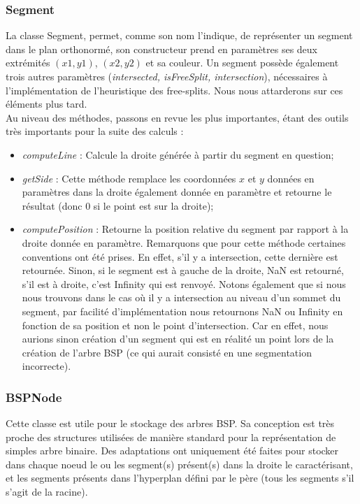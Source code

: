 \documentclass[11pt,a4paper]{article}
\begin{document}
\subsubsection{Segment}
La classe Segment, permet, comme son nom l'indique, de représenter un segment dans le plan orthonormé, son constructeur prend en paramètres ses deux extrémités $(x1,y1)$, $(x2,y2)$ et sa couleur. Un segment possède également trois autres paramètres (\emph{intersected, isFreeSplit, intersection}), nécessaires à l'implémentation de l'heuristique des free-splits. Nous nous attarderons sur ces éléments plus tard. \\
Au niveau des méthodes, passons en revue les plus importantes, étant des outils très importants pour la suite des calculs :
\begin{itemize}
\item \emph{computeLine} : Calcule la droite générée à partir du segment en question;
\item \emph{getSide} : Cette méthode remplace les coordonnées $x$ et $y$ données en paramètres dans la droite également donnée en paramètre et retourne le résultat (donc 0 si le point est sur la droite);
\item \emph{computePosition} : Retourne la position relative du segment par rapport à la droite donnée en paramètre. Remarquons que pour cette méthode certaines conventions ont été prises. En effet, s'il y a intersection, cette dernière est retournée. Sinon, si le segment est à gauche de la droite, NaN est retourné, s'il est à droite, c'est Infinity qui est renvoyé. Notons également que si nous nous trouvons dans le cas où il y a intersection au niveau d'un sommet du segment, par facilité d'implémentation nous retournons NaN ou Infinity en fonction de sa position et non le point d'intersection. Car en effet, nous aurions sinon création d'un segment qui est en réalité un point lors de la création de l'arbre BSP (ce qui aurait consisté en une segmentation incorrecte).
\end{itemize}

\subsubsection{BSPNode} 
Cette classe est utile pour le stockage des arbres BSP. Sa conception est très proche des structures utilisées de manière standard pour la représentation de simples arbre binaire. Des adaptations ont uniquement été faites pour stocker dans chaque noeud le ou les segment(s) présent(s) dans la droite le caractérisant, et les segments présents dans l'hyperplan défini par le père (tous les segments s'il s'agit de la racine). 
\end{document}
